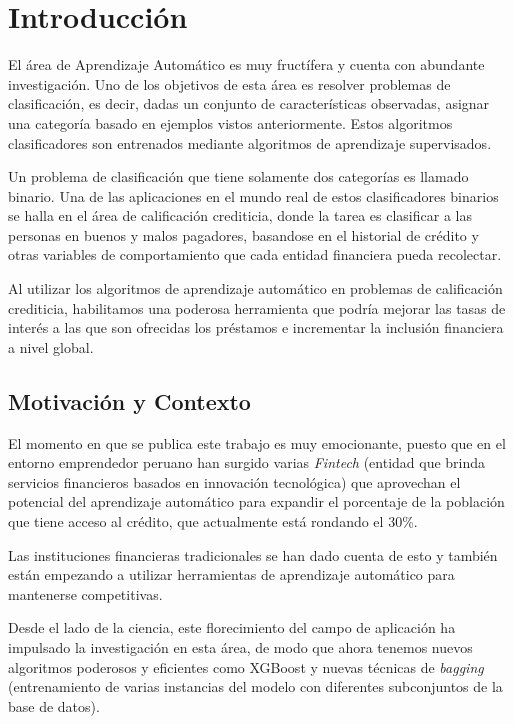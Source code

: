 \chapter{Introducción}

El área de Aprendizaje Automático es muy fructífera y cuenta con abundante investigación. Uno de los objetivos de esta área es resolver problemas de clasificación, es decir, dadas un conjunto de características observadas, asignar una categoría basado en ejemplos vistos anteriormente. Estos algoritmos clasificadores son entrenados mediante algoritmos de aprendizaje supervisados.

Un problema de clasificación que tiene solamente dos categorías es llamado binario. Una de las aplicaciones en el mundo real de estos clasificadores binarios se halla en el área de calificación crediticia, donde la tarea es clasificar a las personas en buenos y malos pagadores, basandose en el historial de crédito y otras variables de comportamiento que cada entidad financiera pueda recolectar.

Al utilizar los algoritmos de aprendizaje automático en problemas de calificación crediticia, habilitamos una poderosa herramienta que podría mejorar las tasas de interés a las que son ofrecidas los préstamos e incrementar la inclusión financiera a nivel global.

\section{Motivación y Contexto}

El momento en que se publica este trabajo es muy emocionante, puesto que en el entorno emprendedor peruano han surgido varias \textit{Fintech} (entidad que brinda servicios financieros basados en innovación tecnológica) que aprovechan el potencial del aprendizaje automático para expandir el porcentaje de la población que tiene acceso al crédito, que actualmente está rondando el 30\%.

Las instituciones financieras tradicionales se han dado cuenta de esto y también están empezando a utilizar herramientas de aprendizaje automático para mantenerse competitivas.

Desde el lado de la ciencia, este florecimiento del campo de aplicación ha impulsado la investigación en esta área, de modo que ahora tenemos nuevos algoritmos poderosos y eficientes como \ac{XGBoost} \citep{Chen:2016:XST:2939672.2939785} y nuevas técnicas de \textit{bagging} (entrenamiento de varias instancias del modelo con diferentes subconjuntos de la base de datos).

